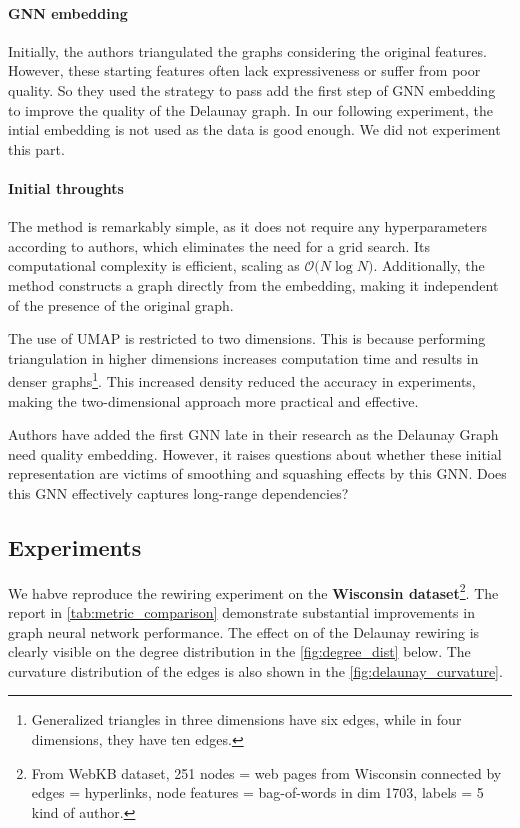 \documentclass{article}
\theoremstyle{plain}
\theoremstyle{definition}
\theoremstyle{remark}
\begin{document}
\paragraph{GNN embedding}
Initially, the authors triangulated the graphs considering the original 
features. However, these starting features often lack
expressiveness or suffer from poor quality. So they used the strategy to pass
add the first step of GNN embedding to improve the quality of the Delaunay graph.
In our following experiment, the intial embedding is not used as the data 
is good enough. We did not experiment this part.





\paragraph{Initial throughts}
The method is remarkably simple, as it does not require any hyperparameters according to authors, 
which eliminates the need for a grid search. Its computational complexity is 
efficient, scaling as $\mathcal{O} \big( N \log N \big)$. 
Additionally, the method constructs a graph directly from the embedding, 
making it independent of the presence of the original graph.

The use of UMAP is restricted to two dimensions. This is because performing 
triangulation in higher dimensions increases computation time and 
results in denser graphs\footnote{Generalized triangles in three dimensions
 have six edges, while in four dimensions, they have ten edges.}. 
This increased density reduced the accuracy in experiments, making the two-dimensional approach more practical and effective.

Authors have added the first GNN late in their research as the Delaunay Graph 
need quality embedding. However, it raises questions about whether these initial
representation are victims of smoothing and squashing effects by this GNN.
Does this GNN effectively captures long-range dependencies?


\subsection{Experiments}
We habve reproduce the rewiring experiment on the \textbf{Wisconsin dataset}\footnote{
From WebKB dataset, 251 nodes = web pages from Wisconsin connected
by edges = hyperlinks, node features = bag-of-words in dim 1703, labels =  5 kind of author.}.
The report in \cref{tab:metric_comparison} demonstrate substantial improvements in graph neural network performance. The effect
on of the Delaunay rewiring is clearly visible on the degree distribution in the \cref{fig:degree_dist} below.
The curvature distribution of the edges is also shown in the \cref{fig:delaunay_curvature}.
\end{document}
